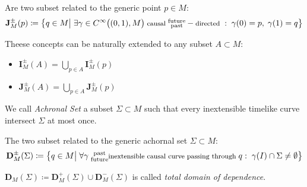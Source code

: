 \documentclass[Main]{subfiles}
\begin{document}
			\begin{definition}
				Are two subset related to the generic point $p	\in M$:
				\begin{displaymath}
					\mathbf{J}_M^\pm(p) \coloneqq \big\{ q \in M \big\vert \; \exists \gamma \in C^\infty\big((0,1), M\big)\; \textrm{\footnotesize causal } \substack{\textrm{future}\\ \textrm{past} } -\textrm{\footnotesize directed }:
					\; \gamma(0)=p,\; \gamma(1)=q  \big\}
				\end{displaymath}		
			\end{definition}

			\begin{notationfix}
				Theese concepts can be naturally extended to any subset $A \subset M$:
				\begin{itemize}
					\item $\mathbf{I}_M^\pm(A) = \bigcup_{p\in A} \mathbf{I}_M^\pm(p) $
					\item $\mathbf{J}_M^\pm(A) = \bigcup_{p\in A} \mathbf{J}_M^\pm(p) $
				\end{itemize}
			\end{notationfix}

			\begin{definition}
				We call \emph{Achronal Set} a subset $\Sigma \subset M$ such that every inextensible timelike curve intersect $\Sigma$ at most once.
			\end{definition}

			\begin{definition}
				The two subset related to the generic achornal set $\Sigma \subset M$:
				\begin{displaymath}		
					\mathbf{D}_M^\pm(\Sigma) \coloneqq \big\{ q \in M \big\vert \; \forall \gamma \substack{\textrm{ past}\\ \textrm{ future} }\textrm{\footnotesize inextensible causal curve passing through }q : \; \gamma(I) \cap \Sigma \neq \emptyset  \big\}
				\end{displaymath}		
			\end{definition}

			\begin{notationfix}
				$\mathbf{D}_M(\Sigma)  \coloneq \mathbf{D}_M^+(\Sigma) \cup \mathbf{D}_M^-(\Sigma)$ is called \emph{total domain of dependence}.
			\end{notationfix}
		
\end{document}
